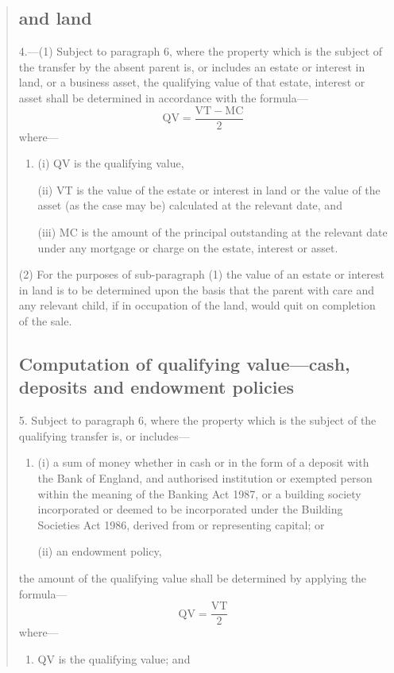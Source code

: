 \documentclass[12pt,a4paper]{article}
\begin{document}
\begin{quotation}
\subsection*{ and land}

4.—(1) Subject to paragraph 6, where the property which is the subject of the transfer by the absent parent is, or includes an estate or interest in land, or a business asset, the qualifying value of that estate, interest or asset shall be determined in accordance with the formula—
\[\mathrm{QV} = \frac{\mathrm{VT} - \mathrm{MC}}{2}\]
where—
\begin{enumerate}\item[]
(i) QV is the qualifying value,

(ii) VT is the value of the estate or interest in land or the value of the asset (as the case may be) calculated at the relevant date, and

(iii) MC is the amount of the principal outstanding at the relevant date under any mortgage or charge on the estate, interest or asset.
\end{enumerate}

(2) For the purposes of sub-paragraph (1) the value of an estate or interest in land is to be determined upon the basis that the parent with care and any relevant child, if in occupation of the land, would quit on completion of the sale.

\subsection*{Computation of qualifying value—cash, deposits and endowment policies}

5.  Subject to paragraph 6, where the property which is the subject of the qualifying transfer is, or includes—
\begin{enumerate}\item[]
(i) a sum of money whether in cash or in the form of a deposit with the Bank of England, and authorised institution or exempted person within the meaning of the Banking Act 1987, or a building society incorporated or deemed to be incorporated under the Building Societies Act 1986, derived from or representing capital; or

(ii) an endowment policy,
\end{enumerate}
the amount of the qualifying value shall be determined by applying the formula—
\[ \mathrm{QV} = \frac{\mathrm{VT}}{2}\]
where—
\begin{enumerate}\item[]
QV is the qualifying value; and


\end{enumerate}
\end{quotation}
\end{document}
